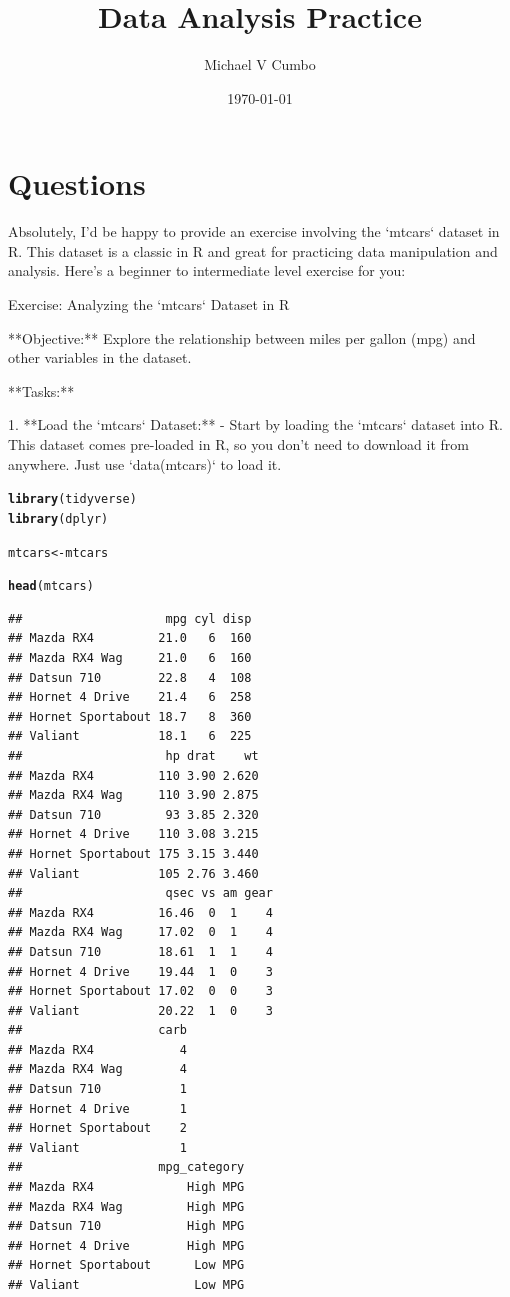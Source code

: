 \documentclass[11pt]{article}\usepackage[]{graphicx}\usepackage[]{xcolor}
\title{\textbf{Data Analysis Practice}}
\author{Michael V Cumbo}
\date{\today}
\makeatletter
\newcommand{\hlstd}[1]{\textcolor[rgb]{0.345,0.345,0.345}{#1}}%
\newcommand{\hlkwb}[1]{\textcolor[rgb]{0.69,0.353,0.396}{#1}}%
\newcommand{\hlkwd}[1]{\textcolor[rgb]{0.737,0.353,0.396}{\textbf{#1}}}%
\newenvironment{kframe}{%
 \def\at@end@of@kframe{}%
 \ifinner\ifhmode%
  \def\at@end@of@kframe{\end{minipage}}%
  \begin{minipage}{\columnwidth}%
 \fi\fi%
 \def\FrameCommand##1{\hskip\@totalleftmargin \hskip-\fboxsep
 \colorbox{shadecolor}{##1}\hskip-\fboxsep
     \hskip-\linewidth \hskip-\@totalleftmargin \hskip\columnwidth}%
 \MakeFramed {\advance\hsize-\width
   \@totalleftmargin\z@ \linewidth\hsize
   \@setminipage}}%
 {\par\unskip\endMakeFramed%
 \at@end@of@kframe}
\newenvironment{knitrout}{}{} %
\makeatother
\begin{document}
\maketitle
\section{Questions}
Absolutely, I'd be happy to provide an exercise involving the `mtcars` dataset in R. This dataset is a classic in R and great for practicing data manipulation and analysis. Here's a beginner to intermediate level exercise for you:

Exercise: Analyzing the `mtcars` Dataset in R

**Objective:** Explore the relationship between miles per gallon (mpg) and other variables in the dataset.

**Tasks:**

1. **Load the `mtcars` Dataset:**
   - Start by loading the `mtcars` dataset into R. This dataset comes pre-loaded in R, so you don't need to download it from anywhere. Just use `data(mtcars)` to load it.
\begin{knitrout}
\color{fgcolor}\begin{kframe}
\begin{alltt}
\hlkwd{library}\hlstd{(tidyverse)}
\hlkwd{library}\hlstd{(dplyr)}

\hlstd{mtcars} \hlkwb{<-} \hlstd{mtcars}

\hlkwd{head}\hlstd{(mtcars)}
\end{alltt}
\begin{verbatim}
##                    mpg cyl disp
## Mazda RX4         21.0   6  160
## Mazda RX4 Wag     21.0   6  160
## Datsun 710        22.8   4  108
## Hornet 4 Drive    21.4   6  258
## Hornet Sportabout 18.7   8  360
## Valiant           18.1   6  225
##                    hp drat    wt
## Mazda RX4         110 3.90 2.620
## Mazda RX4 Wag     110 3.90 2.875
## Datsun 710         93 3.85 2.320
## Hornet 4 Drive    110 3.08 3.215
## Hornet Sportabout 175 3.15 3.440
## Valiant           105 2.76 3.460
##                    qsec vs am gear
## Mazda RX4         16.46  0  1    4
## Mazda RX4 Wag     17.02  0  1    4
## Datsun 710        18.61  1  1    4
## Hornet 4 Drive    19.44  1  0    3
## Hornet Sportabout 17.02  0  0    3
## Valiant           20.22  1  0    3
##                   carb
## Mazda RX4            4
## Mazda RX4 Wag        4
## Datsun 710           1
## Hornet 4 Drive       1
## Hornet Sportabout    2
## Valiant              1
##                   mpg_category
## Mazda RX4             High MPG
## Mazda RX4 Wag         High MPG
## Datsun 710            High MPG
## Hornet 4 Drive        High MPG
## Hornet Sportabout      Low MPG
## Valiant                Low MPG
\end{verbatim}
\end{kframe}
\end{knitrout}
\end{document}
